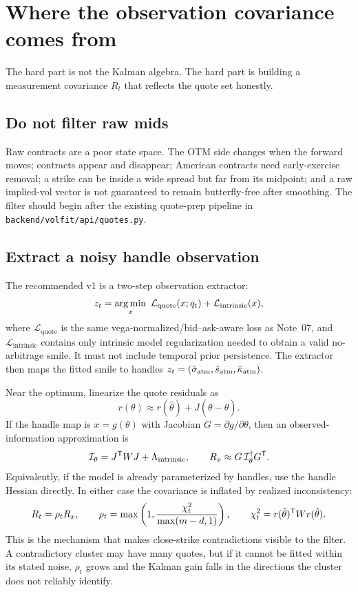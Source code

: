 \documentclass[11pt]{article}
\newcommand{\calL}{\mathcal L}
\newcommand{\calI}{\mathcal I}
\begin{document}
\section{Where the observation covariance comes from}
\label{sec:measurement}

The hard part is not the Kalman algebra. The hard part is building a
measurement covariance $R_t$ that reflects the quote set honestly.

\subsection{Do not filter raw mids}

Raw contracts are a poor state space. The OTM side changes when the forward
moves; contracts appear and disappear; American contracts need early-exercise
removal; a strike can be inside a wide spread but far from its midpoint; and a
raw implied-vol vector is not guaranteed to remain butterfly-free after
smoothing. The filter should begin after the existing quote-prep pipeline in
\nolinkurl{backend/volfit/api/quotes.py}.

\subsection{Extract a noisy handle observation}

The recommended v1 is a two-step observation extractor:
\[
z_t=\argmin_x\ \calL_{\mathrm{quote}}(x;q_t)+\calL_{\mathrm{intrinsic}}(x),
\label{eq:extract}
\]
where $\calL_{\mathrm{quote}}$ is the same vega-normalized/bid--ask-aware loss
as Note~07, and $\calL_{\mathrm{intrinsic}}$ contains only intrinsic model
regularization needed to obtain a valid no-arbitrage smile. It must not include
temporal prior persistence. The extractor then maps the fitted smile to handles
$z_t=(\hat\sigma_{\mathrm{atm}},\hat s_{\mathrm{atm}},\hat\kappa_{\mathrm{atm}})$.

Near the optimum, linearize the quote residuals as
\[
r(\theta)\approx r(\hat\theta)+J(\theta-\hat\theta).
\]
If the handle map is $x=g(\theta)$ with Jacobian $G=\partial g/\partial\theta$,
then an observed-information approximation is
\begin{equation}
\calI_\theta=J\T WJ+\Lambda_{\mathrm{intrinsic}},
\qquad
R_x\approx G\,\calI_\theta\pinv G\T .
\label{eq:cov-delta}
\end{equation}
Equivalently, if the model is already parameterized by handles, use the handle
Hessian directly. In either case the covariance is inflated by realized
inconsistency:
\begin{equation}
R_t=\rho_t R_x,\qquad
\rho_t=\max\left(1,\frac{\chi_t^2}{\max(m-d,1)}\right),
\qquad
\chi_t^2=r(\hat\theta)^{\mathsf{T}} W r(\hat\theta).
\label{eq:resid-inflation}
\end{equation}
This is the mechanism that makes close-strike contradictions visible to the
filter. A contradictory cluster may have many quotes, but if it cannot be fitted
within its stated noise, $\rho_t$ grows and the Kalman gain falls in the
directions the cluster does not reliably identify.
\end{document}
